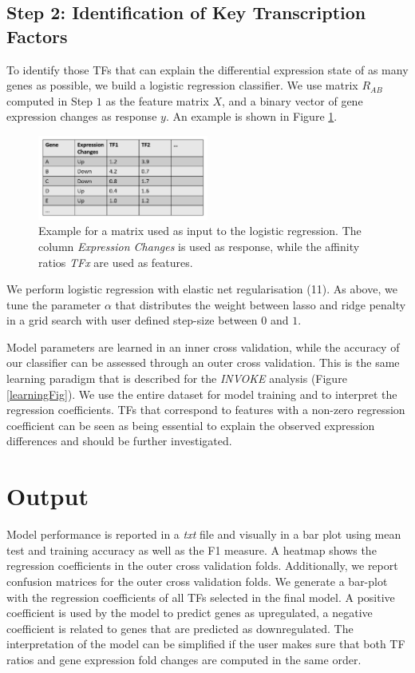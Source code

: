 \documentclass{article}
\begin{document}
\subsection{Step 2: Identification of Key Transcription Factors}
To identify those TFs that can explain the differential expression state of as many genes as possible, we build a logistic regression classifier. 
We use matrix $R_{AB}$ computed in Step $1$ as the feature matrix $X$, and a binary vector of gene expression changes as response $y$. 
An example is shown in Figure \ref{Log-Reg-Example}.
\begin{figure}[h!]
\centering
\includegraphics[width=0.5\textwidth]{Example_Matrix.png}
\caption{Example for a matrix used as input to the logistic regression. The column \textit{Expression Changes} is used as response, while the affinity ratios \textit{TFx} are used as features.}
\label{Log-Reg-Example}
\end{figure}
We perform logistic regression with elastic net regularisation (11).
As above, we tune the parameter $\alpha$ that distributes the weight between lasso and ridge penalty in a grid search with user defined step-size between $0$ and $1$.

Model parameters are learned in an inner cross validation, while the accuracy of our classifier can be assessed through an outer cross validation. This is the
same learning paradigm that is described for the \textit{INVOKE} analysis (Figure \ref{learningFig}). We use the entire dataset for model training and to interpret the regression coefficients.
TFs that correspond to features with a non-zero regression coefficient can be seen as being essential to explain the observed expression differences and should be further investigated.

\section{Output}
Model performance is reported in a \textit{txt} file and visually in a bar plot using mean test and training accuracy as well as the F1 measure.
A heatmap shows the regression coefficients in the outer cross validation folds. 
Additionally, we report confusion matrices for the outer cross validation folds.
We generate a bar-plot with the regression coefficients of all TFs selected in the final model.
A positive coefficient is used by the model to predict genes as upregulated, a negative coefficient is related to genes that are predicted as downregulated. The interpretation
of the model can be simplified if the user makes sure that both TF ratios and gene expression fold changes are computed in the same order. 
\end{document}
